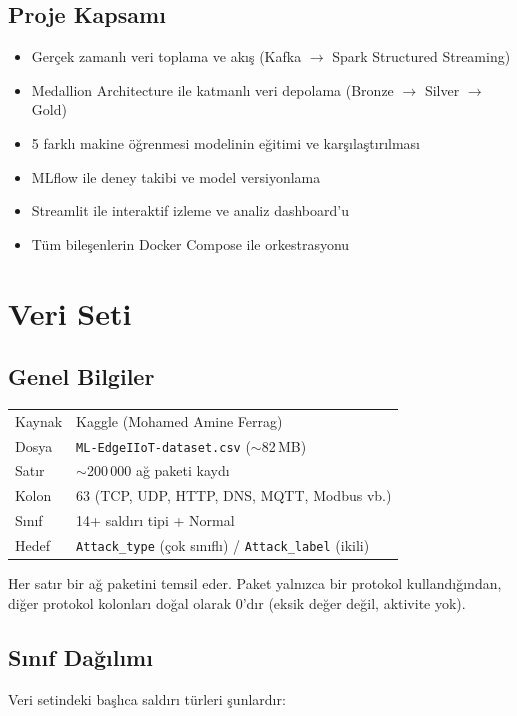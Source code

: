 \documentclass[12pt,a4paper]{article}
\begin{document}
\subsection{Proje Kapsamı}
\begin{itemize}[noitemsep]
  \item Gerçek zamanlı veri toplama ve akış (Kafka $\to$ Spark Structured Streaming)
  \item Medallion Architecture ile katmanlı veri depolama (Bronze $\to$ Silver $\to$ Gold)
  \item 5 farklı makine öğrenmesi modelinin eğitimi ve karşılaştırılması
  \item MLflow ile deney takibi ve model versiyonlama
  \item Streamlit ile interaktif izleme ve analiz dashboard'u
  \item Tüm bileşenlerin Docker Compose ile orkestrasyonu
\end{itemize}

\section{Veri Seti}

\subsection{Genel Bilgiler}
\begin{table}[H]\centering
\begin{tabular}{ll}
\toprule
Kaynak & Kaggle (Mohamed Amine Ferrag) \\
Dosya  & \texttt{ML-EdgeIIoT-dataset.csv} ($\sim$82\,MB) \\
Satır  & $\sim$200\,000 ağ paketi kaydı \\
Kolon  & 63 (TCP, UDP, HTTP, DNS, MQTT, Modbus vb.) \\
Sınıf  & 14+ saldırı tipi + Normal \\
Hedef  & \texttt{Attack\_type} (çok sınıflı) / \texttt{Attack\_label} (ikili) \\
\bottomrule
\end{tabular}
\end{table}

Her satır bir ağ paketini temsil eder. Paket yalnızca bir protokol kullandığından, diğer protokol kolonları doğal olarak 0'dır (eksik değer değil, aktivite yok).

\subsection{Sınıf Dağılımı}
Veri setindeki başlıca saldırı türleri şunlardır:
\end{document}
